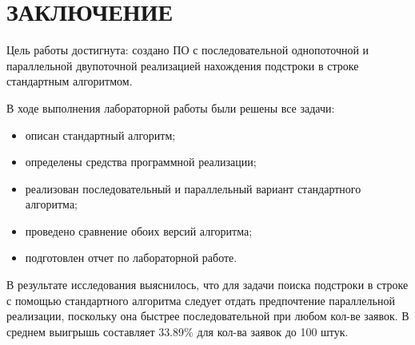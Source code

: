 \section*{ЗАКЛЮЧЕНИЕ}

Цель работы достигнута: создано ПО с последовательной однопоточной и параллельной двупоточной реализацией нахождения подстроки в строке стандартным алгоритмом.

В ходе выполнения лабораторной работы были решены все задачи:
\begin{itemize}
	\item описан стандартный алгоритм;
	\item определены средства программной реализации;
	\item реализован последовательный и параллельный вариант стандартного алгоритма;
	\item проведено сравнение обоих версий алгоритма;
	\item подготовлен отчет по лабораторной работе.
\end{itemize}

В результате исследования выяснилось, что для задачи поиска подстроки в строке с помощью стандартного алгоритма следует отдать предпочтение параллельной реализации, поскольку она быстрее последовательной при любом кол-ве заявок.
В среднем выигрышь составляет 33.89\% для кол-ва заявок до 100 штук.
